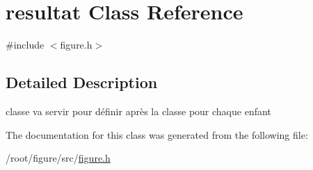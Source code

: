 \hypertarget{classresultat}{}\section{resultat Class Reference}
\label{classresultat}


{\ttfamily \#include $<$figure.\+h$>$}



\subsection{Detailed Description}
classe va servir pour définir après la classe pour chaque enfant 

The documentation for this class was generated from the following file\+:\begin{DoxyCompactItemize}
\item 
/root/figure/src/\hyperlink{figure_8h}{figure.\+h}\end{DoxyCompactItemize}
